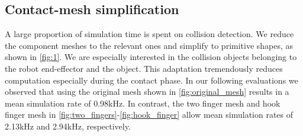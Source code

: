 \subsection{Contact-mesh simplification}
A large proportion of simulation time is spent on collision detection. We reduce the component meshes to the relevant ones and simplify to primitive shapes, as shown in \fig\ref{fig:1}. We are especially interested in the collision objects belonging to the robot end-effector and the object. This adaptation tremendously reduces computation especially during the contact phase. In our following evaluations we observed that using the original mesh shown in \fig\ref{fig:original_mesh} results in a mean simulation rate of 0.98kHz. In contrast, the two finger mesh and hook finger mesh in \fig\ref{fig:two_fingers}-\ref{fig:hook_finger} allow mean simulation rates of 2.13kHz and 2.94kHz, respectively.

